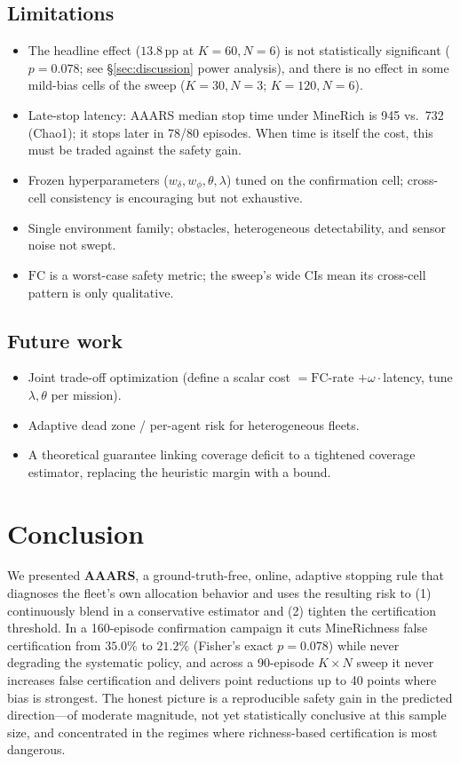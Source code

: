 \documentclass[11pt]{article}
\newcommand{\FC}{\mathrm{FC}}
\begin{document}
\subsection{Limitations}
\begin{itemize}
\item The headline effect ($13.8$\,pp at $K{=}60,N{=}6$) is not statistically significant
($p=0.078$; see \S\ref{sec:discussion} power analysis), and there is no effect in some mild-bias
cells of the sweep ($K{=}30,N{=}3$; $K{=}120,N{=}6$).
\item Late-stop latency: AAARS median stop time under MineRich is 945 vs.\ 732 (Chao1); it stops
later in 78/80 episodes. When time is itself the cost, this must be traded against the safety gain.
\item Frozen hyperparameters ($w_\delta,w_\phi,\theta,\lambda$) tuned on the confirmation cell;
cross-cell consistency is encouraging but not exhaustive.
\item Single environment family; obstacles, heterogeneous detectability, and sensor noise not swept.
\item $\FC$ is a worst-case safety metric; the sweep's wide CIs mean its cross-cell pattern is only
qualitative.
\end{itemize}

\subsection{Future work}
\begin{itemize}
\item Joint trade-off optimization (define a scalar cost $=\FC$-rate $+\omega\cdot$latency, tune
$\lambda,\theta$ per mission).
\item Adaptive dead zone / per-agent risk for heterogeneous fleets.
\item A theoretical guarantee linking coverage deficit to a tightened coverage estimator, replacing
the heuristic margin with a bound.
\end{itemize}

\section{Conclusion}
\label{sec:conclusion}

We presented \textbf{AAARS}, a ground-truth-free, online, adaptive stopping rule that diagnoses the
fleet's own allocation behavior and uses the resulting risk to (1) continuously blend in a
conservative estimator and (2) tighten the certification threshold. In a 160-episode confirmation
campaign it cuts MineRichness false certification from $35.0\%$ to $21.2\%$ (Fisher's exact
$p=0.078$) while never degrading the systematic policy, and across a 90-episode $K\times N$ sweep
it never increases false certification and delivers point reductions up to 40 points where bias is
strongest. The honest picture is a reproducible safety gain in the predicted direction---of
moderate magnitude, not yet statistically conclusive at this sample size, and concentrated in the
regimes where richness-based certification is most dangerous.
\end{document}
